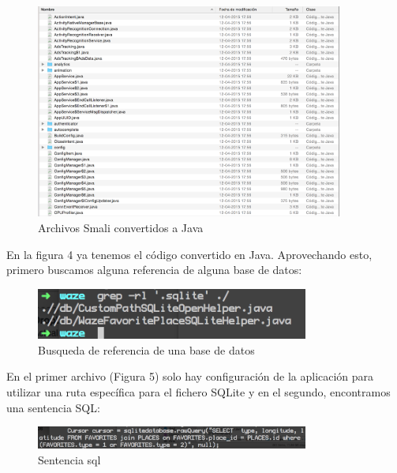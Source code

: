     \begin{figure}[H]
  \begin{center}
    \includegraphics[width=0.9\textwidth]{imagenes/fig27.png}
    \caption{Archivos Smali convertidos a Java}
  \end{center}
\end{figure}

En la figura 4 ya tenemos el código convertido en Java. Aprovechando esto, primero buscamos alguna referencia de alguna base de datos:

    \begin{figure}[H]
  \begin{center}
    \includegraphics[width=0.8\textwidth]{imagenes/fig28.png}
    \caption{Busqueda de referencia de una base de datos}
  \end{center}
\end{figure}

En el primer archivo (Figura 5) solo hay configuración de la aplicación para utilizar una ruta específica para el fichero SQLite y en el segundo, encontramos una sentencia SQL:

    \begin{figure}[H]
  \begin{center}
    \includegraphics[width=0.8\textwidth]{imagenes/fig29.png}
    \caption{Sentencia sql}
  \end{center}
\end{figure}


